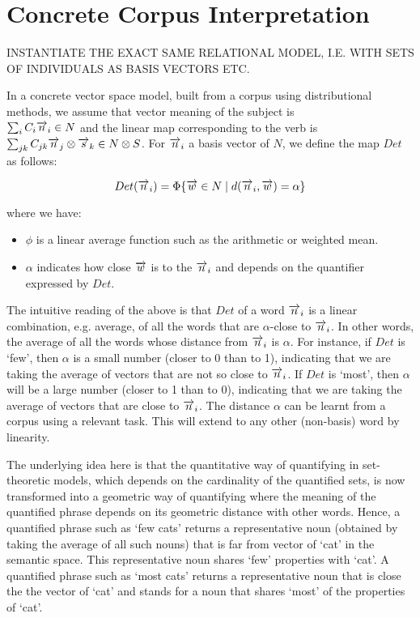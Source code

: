 \section{Concrete Corpus  Interpretation}


INSTANTIATE THE EXACT SAME RELATIONAL MODEL, I.E. WITH SETS OF INDIVIDUALS AS BASIS VECTORS ETC.

In a concrete vector space model, built from a corpus using distributional methods, we assume that  vector meaning of the subject is \\

$\sum_i C_i \overrightarrow{n}_i \in N$ and the linear map corresponding to the verb is\\

 $\sum_{jk} C_{jk} \overrightarrow{n}_j \otimes \overrightarrow{s}_k \in N \otimes S$.  For $\overrightarrow{n}_i$ a basis vector of $N$, we define  the map $Det$  as follows:

\begin{equation}\label{eqDet}
Det(\overrightarrow{n}_i) = \Phi \{\overrightarrow{w} \in N \mid d(\overrightarrow{n}_i, \overrightarrow{w}) = \alpha\}
\end{equation}

\noindent
where we have:
\begin{itemize}
\item  $\phi$ is a linear average function such as the   arithmetic or weighted mean. 
\item  $\alpha$ indicates how close $\overrightarrow{w}$ is to the $\overrightarrow{n}_i$ and depends on the quantifier expressed by $Det$. 
\end{itemize}

\noindent
The intuitive reading of the above is that $Det$ of a word $\overrightarrow{n}_i$ is a linear combination, e.g.  average,  of all the words that are $\alpha$-close to $\overrightarrow{n}_i$. In other words, the average of all the words  whose distance from $\overrightarrow{n}_i$ is $\alpha$.  For instance, if $Det$ is `few', then $\alpha$ is a small number (closer to 0 than to 1), indicating that we are taking the average of vectors that are not so close to $\overrightarrow{n}_i$. If $Det$ is `most', then $\alpha$ will be a large number (closer to 1 than to 0), indicating that we are taking the average of vectors that are close to $\overrightarrow{n}_i$. The distance $\alpha$ can be learnt from a corpus using a relevant task. This will extend to any other (non-basis) word by linearity.  

The underlying idea here is that the quantitative way of quantifying in set-theoretic models, which depends on the cardinality of the quantified sets, is now transformed into a geometric way of quantifying where the meaning of the quantified phrase depends on its geometric distance with other words. Hence, a quantified phrase such as `few cats' returns a representative noun (obtained by taking the average of all such nouns) that is far from vector of  `cat'  in the semantic space. This representative noun shares `few' properties with `cat'. A quantified phrase such as `most cats' returns a representative noun that is close the the vector of `cat' and stands for a noun that shares `most' of the properties of `cat'. 



